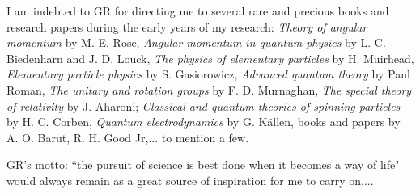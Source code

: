I am indebted to GR for directing me to several rare and precious books and research papers during the early years of my research: \textit{Theory of angular momentum} by M. E. Rose, \textit{Angular momentum in quantum physics} by L. C. Biedenharn and J. D. Louck, \textit{The physics of elementary particles} by H. Muirhead, \textit{Elementary particle physics} by S. Gasiorowicz, \textit{Advanced quantum theory} by Paul Roman, \textit{The unitary and rotation groups} by F. D. Murnaghan, \textit{The special theory of relativity} by J. Aharoni; \textit{Classical and quantum theories of spinning particles} by H. C. Corben, \textit{Quantum electrodynamics} by G. K\"{a}llen, books and papers by A. O. Barut, R. H. Good Jr,... to mention a few.

GR's motto: ``the pursuit of science is best done when it becomes a way of life" would always remain as a great source of inspiration for me to carry on....
\vskip 0.5cm

\drawline
